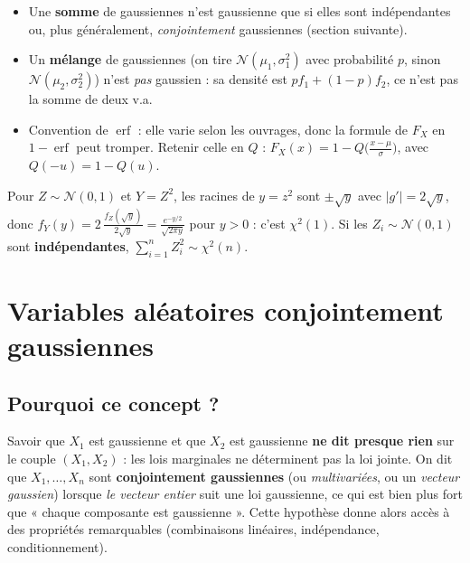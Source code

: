 \documentclass[11pt,a4paper,openany]{book}
\begin{document}
\begin{warnbox}[title={Trois pièges}]
\begin{itemize}
\item Une \textbf{somme} de gaussiennes n'est gaussienne que si elles sont indépendantes ou,
  plus généralement, \emph{conjointement} gaussiennes (section suivante).
\item Un \textbf{mélange} de gaussiennes (on tire $\mathcal{N}(\mu_1,\sigma_1^2)$ avec
  probabilité $p$, sinon $\mathcal{N}(\mu_2,\sigma_2^2)$) n'est \emph{pas} gaussien : sa densité
  est $pf_1+(1-p)f_2$, ce n'est pas la somme de deux v.a.
\item Convention de $\operatorname{erf}$ : elle varie selon les ouvrages, donc la formule de $F_X$
  en $1-\operatorname{erf}$ peut tromper. Retenir celle en $Q$ : $F_X(x) = 1 -
  Q\big(\frac{x-\mu}{\sigma}\big)$, avec $Q(-u)=1-Q(u)$.
\end{itemize}
\end{warnbox}

\begin{exbox}[title={Le carré d'une normale : loi du $\chi^2$}]
Pour $Z\sim\mathcal{N}(0,1)$ et $Y=Z^2$, les racines de $y=z^2$ sont $\pm\sqrt y$ avec
$|g'|=2\sqrt y$, donc $f_Y(y) = 2\,\frac{f_Z(\sqrt y)}{2\sqrt y} = \frac{e^{-y/2}}{\sqrt{2\pi y}}$
pour $y>0$ : c'est $\chi^2(1)$. Si les $Z_i\sim\mathcal{N}(0,1)$ sont \textbf{indépendantes},
$\sum_{i=1}^n Z_i^2\sim\chi^2(n)$.
\end{exbox}


\section{Variables aléatoires conjointement gaussiennes}

\subsection{Pourquoi ce concept ?}

Savoir que $X_1$ est gaussienne et que $X_2$ est gaussienne \textbf{ne dit presque rien} sur
le couple $(X_1,X_2)$ : les lois marginales ne déterminent pas la loi jointe. On dit que
$X_1,\dots,X_n$ sont \textbf{conjointement gaussiennes} (ou \emph{multivariées}, ou un
\emph{vecteur gaussien}) lorsque \emph{le vecteur entier} suit une loi gaussienne, ce qui est
bien plus fort que « chaque composante est gaussienne ». Cette hypothèse donne alors accès à
des propriétés remarquables (combinaisons linéaires, indépendance, conditionnement).
\end{document}
